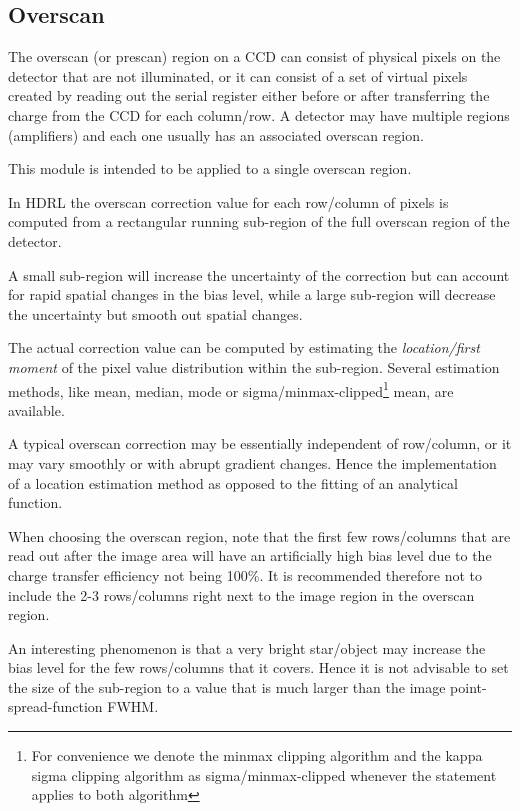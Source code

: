 \subsection{Overscan}
\label{overscan:main}

The overscan (or prescan) region on a CCD can consist of physical
pixels on the detector that are not illuminated, or it can consist of a set
of virtual pixels created by reading out the serial register either before or
after transferring the charge from the CCD for each column/row. 
A detector may have multiple regions (amplifiers) and each one usually has 
an associated overscan region.

This module is intended to be applied to a single overscan region.

In HDRL the overscan correction value for each row/column of pixels is computed
from a rectangular running sub-region of the full overscan region of the
detector.

A small sub-region will increase the uncertainty of the correction but can
account for rapid spatial changes in the bias level, while a large sub-region
will decrease the uncertainty but smooth out spatial changes.

The actual correction value can be computed by estimating the
\textit{location/first moment} of the pixel value distribution within
the sub-region.  Several estimation methods, like mean, median, mode
or sigma/minmax-clipped\footnote{For convenience we denote the minmax
clipping algorithm and the kappa sigma clipping algorithm as
sigma/minmax-clipped whenever the statement applies to both algorithm}
mean, are available.

A typical overscan correction may be essentially independent of row/column,
or it may vary smoothly or with abrupt gradient changes. Hence the 
implementation of a location estimation method as opposed to the fitting of an
analytical function.

When choosing the overscan region, note that the first few rows/columns
that are read out after the image area will have an artificially high bias 
level due to the charge transfer efficiency not being 100\%. It is 
recommended therefore not to include the 2-3 rows/columns right next 
to the image region in the overscan region.

An interesting phenomenon is that a very bright star/object may increase the
bias level for the few rows/columns that it covers. Hence it is not advisable
to set the size of the sub-region to a value that is much larger than the image
point-spread-function FWHM.

